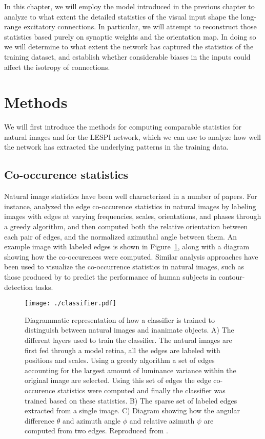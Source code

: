 In this chapter, we will employ the model introduced in the previous
chapter to analyze to what extent the detailed statistics of the
visual input shape the long-range excitatory connections.  In
particular, we will attempt to reconstruct those statistics based
purely on synaptic weights and the orientation map. In doing so we
will determine to what extent the network has captured the statistics
of the training dataset, and establish whether considerable biases in
the inputs could affect the isotropy of connections.

\section{Methods}

We will first introduce the methods for computing comparable
statistics for natural images and for the LESPI network, which we can
use to analyze how well the network has extracted the underlying
patterns in the training data.

\subsection{Co-occurence statistics}

Natural image statistics have been well
characterized in a number of papers. For instance, 
\cite{Perrinet2015} analyzed the edge co-occurence statistics in
natural images by labeling images with edges at varying frequencies,
scales, orientations, and phases through a greedy algorithm, and then
computed both the relative orientation between each pair of edges, and
the normalized azimuthal angle between them. An example image with
labeled edges is shown in Figure~\ref{classifier}, along with a
diagram showing how the co-occurences were computed. Similar analysis
approaches have been used to visualize the co-occurrence statistics in
natural images, such as those produced by \cite{Geisler2001} to
predict the performance of human subjects in contour-detection tasks.

\begin{figure}
	\centering
    \texttt{[image: ./classifier.pdf]}
	\caption[] {Diagrammatic representation of how a classifier is
      trained to distinguish between natural images and inanimate
      objects. A) The different layers used to train the
      classifier. The natural images are first fed through a model
      retina, all the edges are labeled with positions and
      scales. Using a greedy algorithm a set of edges accounting for
      the largest amount of luminance variance within the original
      image are selected. Using this set of edges the edge
      co-occurence statistics were computed and finally the classifier
      was trained based on these statistics. B) The sparse set
      of labeled edges extracted from a single image. C) Diagram
      showing how the angular difference $\theta$ and azimuth angle
      $\phi$ and relative azimuth $\psi$ are computed from two
      edges. Reproduced from \cite{Perrinet2015}.}
	\label{classifier}
\end{figure}

